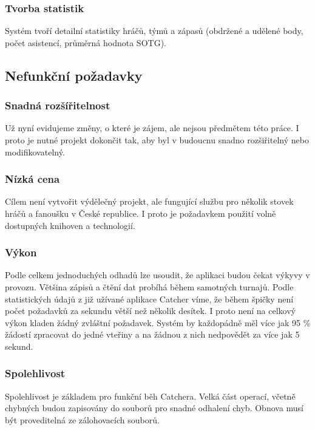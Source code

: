 \subsubsection*{Tvorba statistik}
Systém tvoří detailní statistiky hráčů, týmů a zápasů (obdržené a udělené body,
počet asistencí, průměrná hodnota SOTG).

\subsection{Nefunkční požadavky}

\subsubsection*{Snadná rozšířitelnost}
Už nyní evidujeme změny, o které je zájem, ale nejsou předmětem této práce.
I proto je nutné projekt dokončit tak, aby byl v budoucnu snadno rozšiřitelný nebo
modifikovatelný.

\subsubsection*{Nízká cena}
Cílem není vytvořit výdělečný projekt, ale fungující službu pro několik stovek hráčů
a fanoušku v České republice. I proto je požadavkem použití volně dostupných
knihoven a technologií.

\subsubsection*{Výkon}
Podle celkem jednoduchých odhadů lze usoudit, že aplikaci budou čekat výkyvy v provozu.
Většina zápisů a čtění dat probíhá během samotných turnajů. Podle statistických údajů
z již užívané aplikace Catcher víme, že během špičky není počet požadavků za sekundu
větší než několik desítek. I proto není na celkový výkon kladen žádný zvláštní požadavek.
Systém by každopádně měl více jak 95 \% žádostí zpracovat do jedné vteřiny a na žádnou z nich
nedpovědět za více jak 5 sekund.

\subsubsection*{Spolehlivost}
Spolehlivost je základem pro funkční běh Catchera. Velká část operací, včetně chybných budou
zapisovány do souborů pro snadné odhalení chyb. Obnova musí být proveditelná ze zálohovacích souborů.

